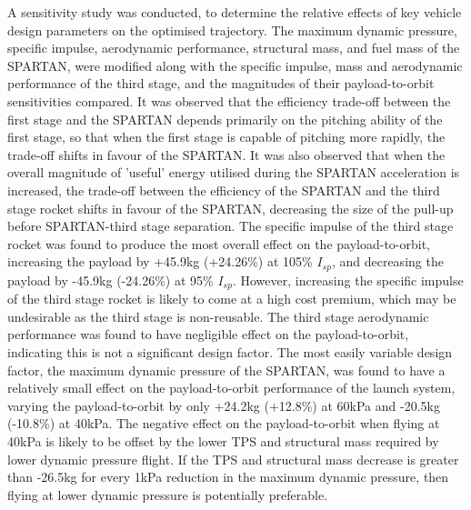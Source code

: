 A sensitivity study was conducted, to determine the relative effects of key vehicle design parameters on the optimised trajectory. 
The maximum dynamic pressure, specific impulse, aerodynamic performance, structural mass, and fuel mass of the SPARTAN, were modified along with the specific impulse, mass and aerodynamic performance of the third stage, and the magnitudes of their payload-to-orbit sensitivities compared. 
It was observed that the efficiency trade-off between the first stage and the SPARTAN depends primarily on the pitching ability of the first stage, so that when the first stage is capable of pitching more rapidly, the trade-off shifts in favour of the SPARTAN. 
It was also observed that when the overall magnitude of 'useful' energy utilised during the SPARTAN acceleration is increased, the trade-off between the efficiency of the SPARTAN and the third stage rocket shifts in favour of the SPARTAN, decreasing the size of the pull-up before SPARTAN-third stage separation. 
The specific impulse of the third stage rocket was found to produce the most overall effect on the payload-to-orbit, increasing the payload by +45.9kg (+24.26\%) at 105\% $I_{sp}$, and decreasing the payload by -45.9kg (-24.26\%) at 95\% $I_{sp}$. However, increasing the specific impulse of the third stage rocket is likely to come at a high cost premium, which may be undesirable as the third stage is non-reusable. 
The third stage aerodynamic performance was found to have negligible effect on the payload-to-orbit, indicating this is not a significant design factor. 
The most easily variable design factor, the maximum dynamic pressure of the SPARTAN, was found to have a relatively small effect on the payload-to-orbit performance of the launch system, varying the payload-to-orbit by only +24.2kg (+12.8\%) at 60kPa and -20.5kg (-10.8\%) at 40kPa. The negative effect on the payload-to-orbit when flying at 40kPa is likely to be offset by the lower TPS and structural mass required by lower dynamic pressure flight. If the TPS and structural mass decrease is greater than -26.5kg for every 1kPa reduction in the maximum dynamic pressure, then flying at lower dynamic pressure is potentially preferable. 







